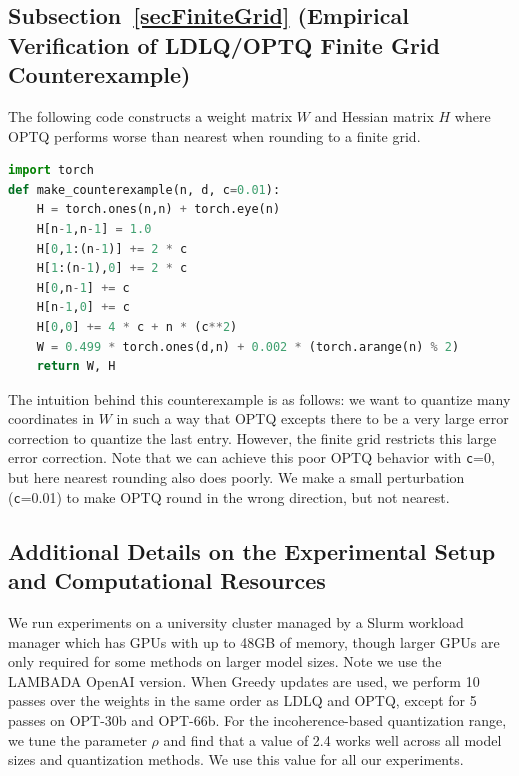 

\lstset{style=mystyle}

\subsection{Subsection~\ref{secFiniteGrid} (Empirical Verification of LDLQ/OPTQ Finite Grid Counterexample)}
The following code constructs a weight matrix $W$ and Hessian matrix $H$ where OPTQ performs worse than nearest when rounding to a finite grid.
\begin{lstlisting}[language=Python]
import torch 
def make_counterexample(n, d, c=0.01):
    H = torch.ones(n,n) + torch.eye(n)
    H[n-1,n-1] = 1.0
    H[0,1:(n-1)] += 2 * c
    H[1:(n-1),0] += 2 * c
    H[0,n-1] += c
    H[n-1,0] += c
    H[0,0] += 4 * c + n * (c**2)
    W = 0.499 * torch.ones(d,n) + 0.002 * (torch.arange(n) % 2)
    return W, H
\end{lstlisting}
The intuition behind this counterexample is as follows: 
we want to quantize many coordinates in $W$ in such a way that OPTQ excepts there to be a very large error correction to quantize the last entry.
However, the finite grid restricts this large error correction.
Note that we can achieve this poor OPTQ behavior with {\texttt c=0}, but here nearest rounding also does poorly.
We make a small perturbation ({\texttt c=0.01}) to make OPTQ round in the wrong direction, but not nearest.



\subsection{Additional Details on the Experimental Setup and Computational Resources}
We run experiments on a university cluster managed by a Slurm workload manager which has GPUs with up to 48GB of memory, though larger GPUs are only required for some methods on larger model sizes.
Note we use the LAMBADA OpenAI version.
When Greedy updates are used, we perform 10 passes over the weights in the same order as LDLQ and OPTQ, except for 5 passes on OPT-30b and OPT-66b.
For the incoherence-based quantization range, we tune the parameter $\rho$ and find that a value of 2.4 works well across all model sizes and quantization methods. We use this value for all our experiments.


